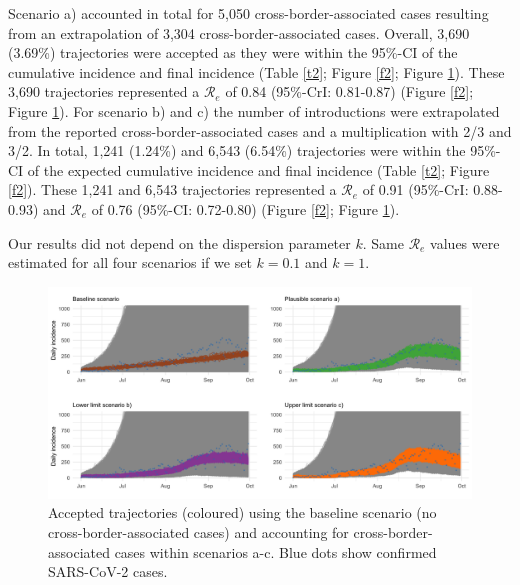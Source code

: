 \documentclass[10pt, a4paper, twoside]{article}
\begin{document}
\begin{multicols}{2}
Scenario a) accounted in total for 5,050 cross-border-associated cases resulting from an extrapolation of 3,304 cross-border-associated cases.
Overall, 3,690 (3.69\%) trajectories were accepted as they were within the 95\%-CI of the cumulative incidence and final incidence (Table \ref{t2}; Figure \ref{f2}; Figure \ref{f3}).
These 3,690 trajectories represented a $\mathcal{R}_e$ of 0.84 (95\%-CrI: 0.81-0.87) (Figure \ref{f2}; Figure \ref{f3}).
For scenario b) and c) the number of introductions were extrapolated from the reported cross-border-associated cases and a multiplication with 2/3 and 3/2.
In total, 1,241 (1.24\%) and 6,543 (6.54\%) trajectories were within the 95\%-CI of the expected cumulative incidence and final incidence (Table \ref{t2}; Figure \ref{f2}).
These 1,241 and 6,543 trajectories represented a $\mathcal{R}_e$ of 0.91 (95\%-CrI: 0.88-0.93) and $\mathcal{R}_e$ of 0.76 (95\%-CI: 0.72-0.80) (Figure \ref{f2}; Figure \ref{f3}).

Our results did not depend on the dispersion parameter $k$.
Same $\mathcal{R}_e$ values were estimated for all four scenarios if we set $k = 0.1$ and $k = 1$.

\begin{figure}
\centering
\includegraphics[scale=0.15]{Figure3_2021-06-02.png}
\caption{Accepted trajectories (coloured) using the baseline scenario (no cross-border-associated cases) and accounting for cross-border-associated cases within scenarios a-c. Blue dots show confirmed SARS-CoV-2 cases.}
\label{f3}
\end{figure}


\end{multicols}
\end{document}
